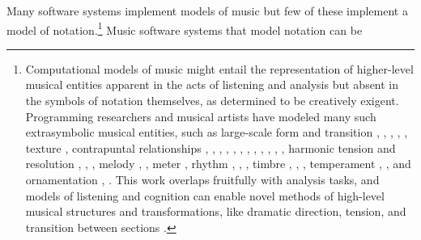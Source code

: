 \documentclass{article}
\begin{document}
Many software systems implement models of music but few of these
implement a model of notation.\footnote{Computational models of music might
entail the representation of higher-level musical entities apparent in the acts
of listening and analysis but absent in the symbols of notation themselves, as
determined to be creatively exigent. Programming researchers and musical
artists have modeled many such extrasymbolic musical entities, such as
large-scale form and transition \cite{polansky1991morphological},
\cite{uno1994temporal}, \cite{dobrian1995algorithmic}, \cite{abrams1999higher},
\cite{Yoo1983}, texture \cite{Horenstein:2004kx}, contrapuntal relationships
\cite{Boenn:2009oq}, \cite{Acevedo2005}, \cite{Anders:2011kl},
\cite{Balser:1990tg}, \cite{Jones:2000hc}, \cite{uno1994temporal},
\cite{Bell:1995ij}, \cite{farbood2001analysis}, \cite{Cope:2002fv},
\cite{Laurson:2005dz}, \cite{Polansky:2011fu}, \cite{Ebcioglu:1980kl}, harmonic
tension and resolution \cite{Melo2003}, \cite{Wiggins1999},
\cite{Foster:1995qa}, melody \cite{Hornel:1993mi}, \cite{Smith:1992pi}, meter
\cite{Hamanaka:2005ff}, rhythm \cite{Nauert2007}, \cite{Degazio:1996lh},
\cite{Collins:2003bs}, timbre \cite{Xenakis:1991fu}, \cite{Creasey:1996ye},
\cite{Osaka2004}, temperament \cite{Seymour:2007qo}, \cite{Graf:2006il}, and
ornamentation \cite{Ariza:2003zt}, \cite{Chico-Topfer:1998jl}. This work
overlaps fruitfully with analysis tasks, and models of listening and cognition
can enable novel methods of high-level musical structures and transformations,
like dramatic direction, tension, and transition between sections
\cite[108]{Collins2009}.} Music software systems that model notation can be
\end{document}
